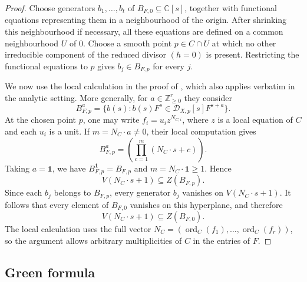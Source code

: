 \documentclass[12pt]{amsart}
\numberwithin{equation}{section}
\theoremstyle{plain}
\theoremstyle{definition}
\theoremstyle{remark}
\theoremstyle{definition}
\DeclareMathOperator{\ord}{ord}
\newcommand{\C}{\mathbb C}
\newcommand{\Z}{\mathbb Z}
\newcommand{\D}{\mathscr D}
\newcommand{\one}{\mathbf 1}
\begin{document}
\begin{proof}
Choose generators $b_1,\ldots,b_t$ of $B_{F,0}\subseteq\C[s]$, together with functional equations representing them in a neighbourhood of the origin. After shrinking this neighbourhood if necessary, all these equations are defined on a common neighbourhood $U$ of $0$. Choose a smooth point $p\in C\cap U$ at which no other irreducible component of the reduced divisor $(h=0)$ is present. Restricting the functional equations to $p$ gives $b_j\in B_{F,p}$ for every $j$.

We now use the local calculation in the proof of \cite[Proposition~1.3]{BvdVVW2024}, which also applies verbatim in the analytic setting. More generally, for $a\in\Z_{\ge0}^r$ they consider
\begin{equation*}
B_{F,p}^a=\{b(s):b(s)F^s\in\D_{X,p}[s]F^{s+a}\}.
\end{equation*}
At the chosen point $p$, one may write $f_i=u_i z^{N_{C,i}}$, where $z$ is a local equation of $C$ and each $u_i$ is a unit. If $m=N_C\cdot a\neq0$, their local computation gives
\begin{equation*}
B_{F,p}^a=\left(\prod_{c=1}^m(N_C\cdot s+c)\right).
\end{equation*}
Taking $a=\one$, we have $B_{F,p}^{\one}=B_{F,p}$ and $m=N_C\cdot\one\ge1$. Hence
\begin{equation*}
V(N_C\cdot s+1)\subseteq Z(B_{F,p}).
\end{equation*}
Since each $b_j$ belongs to $B_{F,p}$, every generator $b_j$ vanishes on $V(N_C\cdot s+1)$. It follows that every element of $B_{F,0}$ vanishes on this hyperplane, and therefore
\begin{equation*}
V(N_C\cdot s+1)\subseteq Z(B_{F,0}).
\end{equation*}
The local calculation uses the full vector $N_C=(\ord_C(f_1),\ldots,\ord_C(f_r))$, so the argument allows arbitrary multiplicities of $C$ in the entries of $F$.
\end{proof}




\subsection{Green formula}
\end{document}
